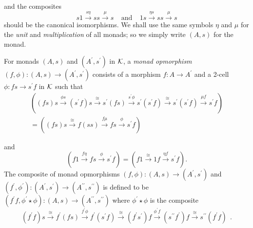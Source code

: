 \documentclass[a4paper,10pt]{article}
\newcommand{\bk}{{\cal{K}}}
\numberwithin{equation}{section}
\begin{document}
\noindent and the composites
\begin{equation}
s 1\overset{s \eta }{\longrightarrow }s s\overset{\mu }{\longrightarrow
}s\ \ \ \ \ \mathrm{and}\ \ \ \ \ 1 s\overset{\eta  s}{\longrightarrow
}s s\overset{\mu }{\longrightarrow }s
\end{equation}
should be the canonical isomorphisms. 
We shall use the same symbols $\eta$ and $\mu$ for the {\it unit} and {\it multiplication} of all monads; so we simply write $(A,s)$ for the monad.

For monads $(A,s)$ and $(A^{\prime },s^{\prime })$ in $\bk$, a {\it monad opmorphism} $(f,\phi):(A,s) \longrightarrow (A^{\prime },s^{\prime })$ consists of a morphism $f:A \longrightarrow A^{\prime }$ and a 2-cell $\phi: fs \longrightarrow s^{\prime } f$ in $\bk$ such that
\begin{multline}\label{XRef-Equation-opmor1}
\left( \left( f s\right) s\overset{\phi  s}{\longrightarrow }\left(
s^{\prime }f\right) s\overset{\cong }{\longrightarrow }s^{\prime
}( f s) \overset{s^{\prime }\phi }{\longrightarrow }s^{\prime }(
s^{\prime } f) \overset{\cong }{\longrightarrow }s^{\prime }(  s^{\prime
}f) \overset{\mu  f}{\longrightarrow }s^{\prime }f\right) \\
=\left( \left( f s\right) s\overset{\cong }{\longrightarrow }f(
s s) \overset{f \mu }{\longrightarrow }f s\overset{\phi }{\longrightarrow
}s^{\prime } f\right) 
\end{multline}

\noindent and
\begin{equation}\label{XRef-Equation-opmor2}
\left( f 1\overset{f \eta }{\longrightarrow }f s\overset{\phi }{\longrightarrow
}s^{\prime } f\right) =\left( f 1\overset{\cong }{\longrightarrow
}1 f\overset{\eta  f}{\longrightarrow }s^{\prime } f\right)  .
\end{equation}
\noindent The composite of monad opmorphisms 
$(f,\phi):(A,s) \longrightarrow (A^{\prime },s^{\prime })$ 
and $(f^{\prime },\phi ^{\prime }):(A^{\prime },s^{\prime }) \longrightarrow (A^{\prime\prime },s^{\prime\prime })$ 
is defined to be $(f^{\prime }f,\phi ^{\prime } \star \phi):(A,s) \longrightarrow (A^{\prime\prime },s^{\prime\prime })$ 
where $\phi ^{\prime } \star \phi$ is the composite 
\begin{equation}
\left( f^{\prime }f\right) s\overset{\cong }{\longrightarrow }f^{\prime
}( f s) \overset{f^{\prime }\phi }{\longrightarrow }f^{\prime }(
s^{\prime } f) \overset{\cong }{\longrightarrow }\left( f^{\prime
} s^{\prime }\right) f\overset{\phi ^{\prime }f}{\longrightarrow
}\left( s^{{\prime\prime}}f^{\prime }\right) f\overset{\cong }{\longrightarrow
}s^{{\prime\prime}}( f^{\prime }f) \ \ .
\end{equation}
\end{document}
